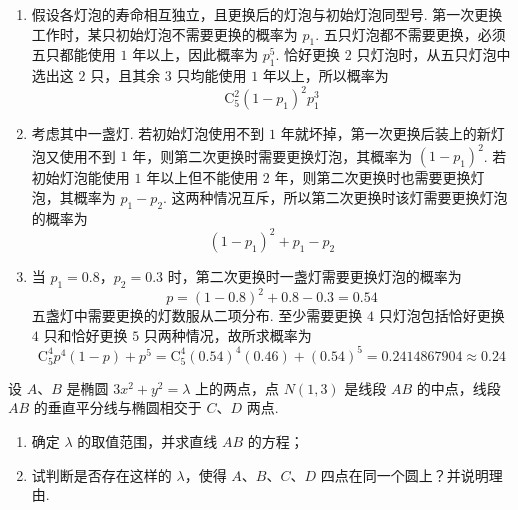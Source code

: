 \begin{solution}
\begin{enumerate}
\item 假设各灯泡的寿命相互独立，且更换后的灯泡与初始灯泡同型号. 第一次更换工作时，某只初始灯泡不需要更换的概率为 \(p_1\). 五只灯泡都不需要更换，必须五只都能使用 \(1\) 年以上，因此概率为 \(p_1^5\). 恰好更换 \(2\) 只灯泡时，从五只灯泡中选出这 \(2\) 只，且其余 \(3\) 只均能使用 \(1\) 年以上，所以概率为
\[
\mathrm C_5^2(1-p_1)^2p_1^3
\]
\item 考虑其中一盏灯. 若初始灯泡使用不到 \(1\) 年就坏掉，第一次更换后装上的新灯泡又使用不到 \(1\) 年，则第二次更换时需要更换灯泡，其概率为 \((1-p_1)^2\). 若初始灯泡能使用 \(1\) 年以上但不能使用 \(2\) 年，则第二次更换时也需要更换灯泡，其概率为 \(p_1-p_2\). 这两种情况互斥，所以第二次更换时该灯需要更换灯泡的概率为
\[
(1-p_1)^2+p_1-p_2
\]
\item 当 \(p_1=0.8\)，\(p_2=0.3\) 时，第二次更换时一盏灯需要更换灯泡的概率为
\[
p=(1-0.8)^2+0.8-0.3=0.54
\]
五盏灯中需要更换的灯数服从二项分布. 至少需要更换 \(4\) 只灯泡包括恰好更换 \(4\) 只和恰好更换 \(5\) 只两种情况，故所求概率为
\[
\mathrm C_5^4p^4(1-p)+p^5=\mathrm C_5^4(0.54)^4(0.46)+(0.54)^5=0.2414867904\approx0.24
\]
\end{enumerate}
\end{solution}

\begin{problem}
设 \(A\)、\(B\) 是椭圆 \(3x^{2} + y^{2} = \lambda\) 上的两点，点 \(N(1,3)\) 是线段 \(AB\) 的中点，线段 \(AB\) 的垂直平分线与椭圆相交于 \(C\)、\(D\) 两点.

\begin{enumerate}
\item 确定 \(\lambda\) 的取值范围，并求直线 \(AB\) 的方程；
\item 试判断是否存在这样的 \(\lambda\)，使得 \(A\)、\(B\)、\(C\)、\(D\) 四点在同一个圆上？并说明理由.
\end{enumerate}
\end{problem}

